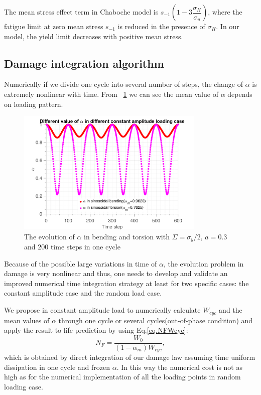 \documentclass[3p,times,number,review]{elsarticle}
\newcommand{\figref}[1]{\figurename~\ref{#1}}
\begin{document}
The mean stress effect term in Chaboche model is $s_{-1}\left(1-3\dfrac{\sigma_H}{\sigma_u} \right)$, where the fatigue limit at zero mean stress $s_{-1}$ is reduced in the presence of $\sigma_H$. In our model, the yield limit decreases with positive mean stress. 


\subsection{Damage integration algorithm}

Numerically if we divide one cycle into several number of steps, the  change of $\alpha$ is extremely nonlinear with time. From \figref{fig.alpmean} we can see the mean value of $\alpha$ depends on loading pattern. 

\begin{figure}[!h]
	\centering
	\includegraphics[width=0.8\textwidth]{figures//alp_mean_methods.png} 
	\caption{The evolution of $\alpha$ in bending and torsion with $\Sigma=\sigma_y/2$, $a=0.3$ and $200$ time steps in one cycle}
	\label{fig.alpmean}
\end{figure}


Because of the possible large variations in time  of $\alpha$, the evolution problem in damage is very nonlinear and thus, one needs to develop and validate an improved numerical time integration strategy at least  for two specific cases: the constant amplitude case and the random load case.

We propose in constant amplitude load to numerically calculate $W_{cyc}$ and the mean values of $\alpha$ through one cycle or several cycles(out-of-phase condition) and apply the result to life prediction by using  Eq.\eqref{eq.NFWcyc}:
\begin{equation}
N_F= \dfrac{W_0}{\left( 1-\alpha_m\right) W_{cyc}},
\label{eq.cycNF}
\end{equation}
which is obtained by direct integration of our damage law assuming time uniform dissipation in one cycle and frozen $\alpha$.
In this way the numerical cost is not as high as for the numerical implementation of all the loading points in random loading case.
\end{document}
